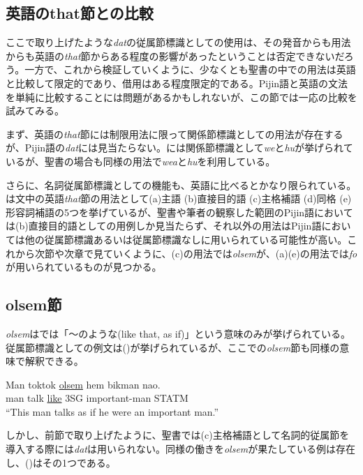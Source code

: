 \subsection{英語のthat節との比較}\label{sec:vsthat}

ここで取り上げたような\textit{dat}の従属節標識としての使用は、その発音からも用法からも英語の\textit{that}節からある程度の影響があったということは否定できないだろう。一方で、これから検証していくように、少なくとも聖書の中での用法は英語と比較して限定的であり、借用はある程度限定的である。Pijin語と英語の文法を単純に比較することには問題があるかもしれないが、この節では一応の比較を試みてみる。

まず、英語の\textit{that}節には制限用法に限って関係節標識としての用法が存在する\cite[365--367]{english}が、Pijin語の\textit{dat}には見当たらない。\cite{dictionary}には関係節標識として\textit{we}と\textit{hu}が挙げられているが、聖書の場合も同様の用法で\textit{wea}と\textit{hu}を利用している。

さらに、名詞従属節標識としての機能も、英語に比べるとかなり限られている。\cite{english}は文中の英語\textit{that}節の用法として(a)主語 (b)直接目的語  (c)主格補語 (d)同格 (e)形容詞補語の5つを挙げているが、聖書や筆者の観察した範囲のPijin語においては(b)直接目的語としての用例しか見当たらず、それ以外の用法はPijin語においては他の従属節標識あるいは従属節標識なしに用いられている可能性が高い。これから次節や次章で見ていくように、(c)の用法では\textit{olsem}が、(a)(e)の用法では\textit{fo}が用いられているものが見つかる。

\subsection{olsem節}
\textit{olsem}は\cite{dictionary}では「～のような(like that, as if)」という意味のみが挙げられている。従属節標識としての例文は()が挙げられているが、ここでの\textit{olsem}節も同様の意味で解釈できる。
%
\begin{exe}
  \ex\label{ex:naostatm}
  \gll Man toktok \underline{olsem} hem bikman nao.\\
  man talk \underline{like} 3SG important-man STATM\\
  \glt ``This man talks as if he were an important man.'' \citep[157]{dictionary}
\end{exe}

しかし、前節で取り上げたように、聖書では(c)主格補語として名詞的従属節を導入する際には\textit{dat}は用いられない。同様の働きを\textit{olsem}が果たしている例は存在し、()はその1つである。

